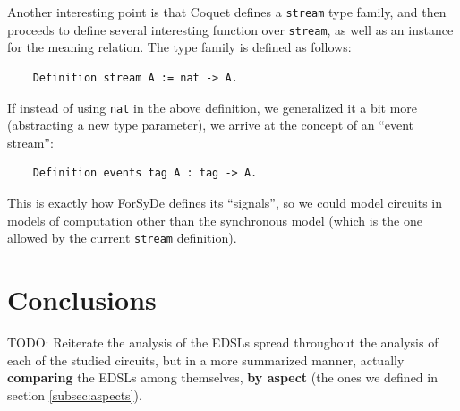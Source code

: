 \documentclass[a4paper]{article}
\begin{document}
                Another interesting point is that Coquet defines a \texttt{stream} type family, and
                then proceeds to define several interesting function over \texttt{stream}, as well
                as an instance for the meaning relation. The type family is defined as follows:
                \begin{verbatim}
    Definition stream A := nat -> A.
                \end{verbatim}
                If instead of using \texttt{nat} in the above definition, we generalized it a bit
                more (abstracting a new type parameter), we arrive at the concept of an ``event
                stream'':
                \begin{verbatim}
    Definition events tag A : tag -> A.
                \end{verbatim}
                This is exactly how ForSyDe defines its ``signals'', so we could model circuits in
                models of computation other than the synchronous model (which is the one allowed by
                the current \texttt{stream} definition).



    \section{Conclusions}
    \label{sec:conclusions}
        TODO: Reiterate the analysis of the EDSLs spread throughout the analysis of each of the
        studied circuits, but in a more summarized manner, actually \textbf{comparing} the EDSLs
        among themselves, \textbf{by aspect} (the ones we defined in section \ref{subsec:aspects}).


    
    
\end{document}
